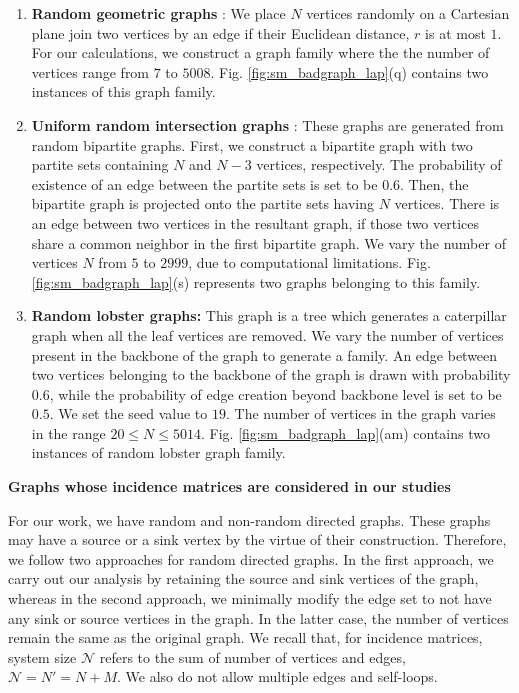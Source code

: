 \documentclass[%
 reprint,
 superscriptaddress,
 amsmath,amssymb,
 aps,
 pra,
floatfix,
nofootinbib,
]{revtex4-2}
\theoremstyle{definition}
\theoremstyle{remark}
\newcommand{\appsubsection}[1]{%
  \refstepcounter{subsection}%
  \bigskip
  \noindent\textbf{\thesubsection\quad #1}\par
  \smallskip
}
\begin{document}
\begin{appendix}
\begin{enumerate}
		\item 
        \textbf{Random geometric graphs} 
        \cite{penrose2003random}: We place $N$ vertices randomly on a Cartesian plane join two vertices by an edge if their Euclidean distance, $r$ is at most $1$. For our calculations, we construct a graph family where the the number of vertices range from $7$ to $5008$. Fig. \ref{fig:sm_badgraph_lap}(q) contains two instances of this graph family.
        
		\item 
        \textbf{Uniform random intersection graphs}
        \cite{fill2000random}: These graphs are generated from random bipartite graphs. First, we construct a bipartite graph with two partite sets containing $N$ and $N - 3$ vertices, respectively. The probability of existence of an edge between the partite sets is set to be $0.6$. Then, the bipartite graph is projected onto the partite sets having $N$ vertices. There is an edge between two vertices in the resultant graph, if those two vertices share a common neighbor in the first bipartite graph. We vary the number of vertices $N$ from $5$ to $2999$, due to computational limitations. Fig. \ref{fig:sm_badgraph_lap}(s) represents two graphs belonging to this family.
		
		\item 
		\textbf{Random lobster graphs:} 
        This graph is a tree which generates a caterpillar graph when all the leaf vertices are removed. We vary the number of vertices present in the backbone of the graph to generate a family. An edge between two vertices belonging to the backbone of the graph is drawn with probability $0.6$, while the probability of edge creation beyond backbone level is set to be $0.5$. We set the seed value to $19$. The number of vertices in the graph varies in the range $20 \leq N \leq 5014$. Fig. \ref{fig:sm_badgraph_lap}(am) contains two instances of random lobster graph family.
	\end{enumerate}

\appsubsection{Graphs whose incidence matrices are considered in our studies} 

    For our work, we have random and non-random directed graphs. These graphs may have a source or a sink vertex by the virtue of their construction. Therefore, we follow two approaches for random directed graphs. In the first approach, we carry out our analysis by retaining the source and sink vertices of the graph, whereas in the second approach, we minimally modify the edge set to not have any sink or source vertices in the graph. In the latter case, the number of vertices remain the same as the original graph. We recall that, for incidence matrices, system size $\mathcal{N}$ refers to the sum of number of vertices and edges, $\mathcal{N} = N' = N+M$. We also do not allow multiple edges and self-loops. 


\end{appendix}
\end{document}
